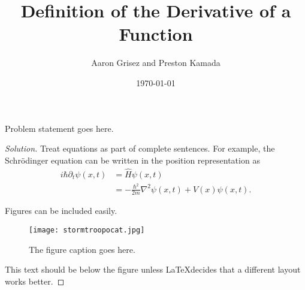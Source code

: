 \documentclass[aps,pra,notitlepage,amsmath,amssymb,letterpaper,12pt]{revtex4-1}
\newenvironment{problem}[2][Problem]{\begin{trivlist}
\item[\hskip \labelsep {\bfseries #1}\hskip \labelsep {\bfseries #2.}]}{\end{trivlist}}
\newenvironment{solution}{\begin{proof}[Solution]}{\end{proof}}
\begin{document}
 
\title{Definition of the Derivative of a Function}
\author{Aaron Grisez and Preston Kamada}
\date{\today}

\maketitle

\begin{problem}{1} 
Problem statement goes here.
\end{problem}
 
\begin{solution} %
Treat equations as part of complete sentences.  For example, the Schr\"odinger equation can be written in the position representation as
\begin{align}
i\hbar \partial_t \psi(x,t) & = \hat{H}\psi(x,t) \\
& = -\frac{\hbar^2}{2m}\nabla^2\psi(x,t) + V(x)\psi(x,t). \nonumber %
\end{align}

Figures can be included easily.

\begin{figure}[h!] %
  \texttt{[image: stormtroopocat.jpg]}  %
  \caption{The figure caption goes here.}
  \label{fig:figlabel}
\end{figure}

This text should be below the figure unless \LaTeX decides that a different layout works better.
\end{solution}
 
 
 
\end{document}
